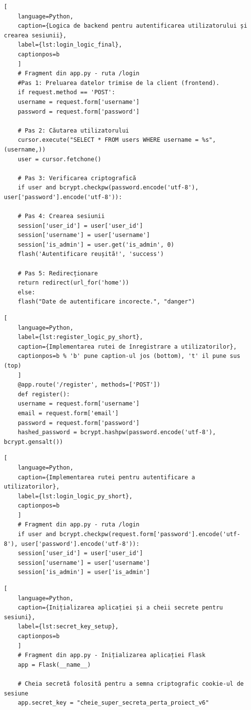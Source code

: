 \documentclass[12pt, a4paper, oneside, romanian]{teza-upb}
\begin{document}
\begin{lstlisting}[
	language=Python,
	caption={Logica de backend pentru autentificarea utilizatorului și crearea sesiunii},
	label={lst:login_logic_final},
	captionpos=b
	]
	# Fragment din app.py - ruta /login
	#Pas 1: Preluarea datelor trimise de la client (frontend).
	if request.method == 'POST':
	username = request.form['username']
	password = request.form['password']
	
	# Pas 2: Căutarea utilizatorului
	cursor.execute("SELECT * FROM users WHERE username = %s", (username,))
	user = cursor.fetchone()
	
	# Pas 3: Verificarea criptografică
	if user and bcrypt.checkpw(password.encode('utf-8'), user['password'].encode('utf-8')):
	
	# Pas 4: Crearea sesiunii
	session['user_id'] = user['user_id'] 
	session['username'] = user['username']
	session['is_admin'] = user.get('is_admin', 0)	
	flash('Autentificare reușită!', 'success')
	
	# Pas 5: Redirecționare
	return redirect(url_for('home'))
	else:
	flash("Date de autentificare incorecte.", "danger")
\end{lstlisting}

\begin{lstlisting}[
	language=Python,
	label={lst:register_logic_py_short},
	caption={Implementarea rutei de înregistrare a utilizatorilor},
	captionpos=b % 'b' pune caption-ul jos (bottom), 't' il pune sus (top)
	]
	@app.route('/register', methods=['POST'])
	def register():
	username = request.form['username']
	email = request.form['email']
	password = request.form['password']
	hashed_password = bcrypt.hashpw(password.encode('utf-8'), bcrypt.gensalt())
\end{lstlisting}

\begin{lstlisting}[
	language=Python,
	caption={Implementarea rutei pentru autentificare a utilizatorilor},
	label={lst:login_logic_py_short},
	captionpos=b
	]	
	# Fragment din app.py - ruta /login
	if user and bcrypt.checkpw(request.form['password'].encode('utf-8'), user['password'].encode('utf-8')):
	session['user_id'] = user['user_id']
	session['username'] = user['username']
	session['is_admin'] = user['is_admin']
\end{lstlisting}

\begin{lstlisting}[
	language=Python,
	caption={Inițializarea aplicației și a cheii secrete pentru sesiuni},
	label={lst:secret_key_setup},
	captionpos=b
	]
	# Fragment din app.py - Inițializarea aplicației Flask
	app = Flask(__name__)
	
	# Cheia secretă folosită pentru a semna criptografic cookie-ul de sesiune
	app.secret_key = "cheie_super_secreta_perta_proiect_v6"
\end{lstlisting}
\end{document}
